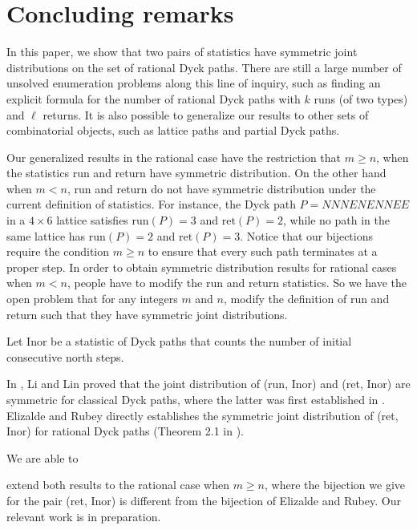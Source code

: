 \documentclass[11pt,a4paper,reqno]{article}
\newcommand{\run}{\mathrm{run}}
\newcommand{\ret}{\mathrm{ret}}
\begin{document}
{	
	\section{Concluding remarks}\label{open}
	In this paper, we show that two pairs of statistics have symmetric joint distributions on the set of rational Dyck paths. There are still a large number of {unsolved enumeration problems along this line of inquiry}, such as {finding} an explicit formula for the number of rational Dyck paths with $k$ runs (of two types) and $\ell$ returns. It is also possible to generalize our results to other sets of combinatorial objects, such as lattice paths and partial Dyck paths. 
    
   Our generalized results in the rational case have the restriction that $m \geq n$, when the statistics run and return have symmetric distribution. On the other hand when $m<n$, run and return do not have symmetric distribution under the current definition of statistics. For instance, the Dyck path $P = NNNENENNEE$ in a $4 \times 6$ lattice satisfies $\run(P) = 3$  and $\ret(P) = 2$, while no path in the same lattice has $\run(P) = 2$ and $\ret(P) = 3$. Notice that our bijections require the condition $m\ge n$ to ensure that every such path terminates at a proper step. In order to obtain symmetric distribution results for rational cases when $m<n$, people have to modify the run and return statistics. 
    So we have the open problem that for any integers $m$ and $n$, modify the definition of run and return such that they have symmetric joint distributions.

	Let Inor be a statistic of Dyck paths that counts the number of initial consecutive north steps. {In \cite{Li}, Li and Lin proved that the joint distribution of (run, Inor) and (ret, Inor) are symmetric for classical Dyck paths, where the latter was first established in \cite{Deu1}. 
    Elizalde and Rubey directly establishes the symmetric joint distribution of (ret, Inor) for rational Dyck paths (Theorem 2.1 in \cite{Eli}). 
 
    We are able to} extend both results to the rational case when $m\geq n$, where the bijection we give for the pair (ret, Inor) is different from the bijection of Elizalde and Rubey. Our relevant work is in preparation.
	
}
\end{document}
